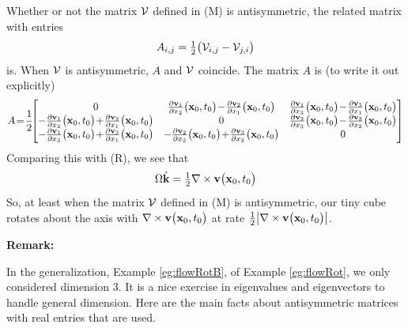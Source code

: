 \begin{eg}\label{eg:flowRotC}

Whether or not the matrix $\mathcal{V}$ defined in (M) is antisymmetric, 
the related matrix with entries
\begin{equation*}
A_{i,j}=\tfrac{1}{2}\big(\mathcal{V}_{i,j}-\mathcal{V}_{j,i}\big)
\end{equation*}
is.  When $\mathcal{V}$ is antisymmetric, $A$ and $\mathcal{V}$ coincide. The matrix $A$
is (to write it out explicitly)
\begin{equation*}
A\!=\!\frac{1}{2}\!\!\left[\begin{matrix}0 & 
                        \frac{\partial \vv_1}{\partial x_2}\big(\vx_0,t_0\big)
                   \!-\!\frac{\partial \vv_2}{\partial x_1}\big(\vx_0,t_0\big)&
                        \frac{\partial \vv_1}{\partial x_3}\big(\vx_0,t_0\big)
                  \!-\!\frac{\partial \vv_3}{\partial x_1}\big(\vx_0,t_0\big)\cr
                        -\frac{\partial \vv_1}{\partial x_2}\big(\vx_0,t_0\big)
                   \!+\!\frac{\partial \vv_2}{\partial x_1}\big(\vx_0,t_0\big)&
                        0 &
                        \frac{\partial \vv_2}{\partial x_3}\big(\vx_0,t_0\big)
                   \!-\!\frac{\partial \vv_3}{\partial x_2}\big(\vx_0,t_0\big)\cr
                       -\frac{\partial \vv_1}{\partial x_3}\big(\vx_0,t_0\big)
                    \!+\!\frac{\partial \vv_3}{\partial x_1}\big(\vx_0,t_0\big)&
                       -\frac{\partial \vv_2}{\partial x_3}\big(\vx_0,t_0\big)
                    \!+\!\frac{\partial \vv_3}{\partial x_2}\big(\vx_0,t_0\big)&
                     0\end{matrix}\right]
\end{equation*}
Comparing this with (R), we see that
\begin{equation*}
\Omega \hat{\mathbf{k}}=\tfrac{1}{2}\nabla\times \mathbf{v}\big(\mathbf{x}_0,t_0\big)
\end{equation*}
So, at least when the matrix $\mathcal{V}$ defined in (M) is antisymmetric, 
our tiny cube rotates about the axis with 
$\nabla\times \mathbf{v}\big(\mathbf{x}_0,t_0\big)$ at rate
$\tfrac{1}{2}\big|\nabla\times \mathbf{v}\big(\mathbf{x}_0,t_0\big)\big|$. 

\end{eg}

\noindent\textbf{Remark:}

\noindent
In the generalization, Example \ref{eg:flowRotB}, of 
Example \ref{eg:flowRot}, we only considered dimension 3. It
is a nice exercise in eigenvalues and eigenvectors to handle general dimension.
Here are the main facts about antisymmetric matrices with real entries
that are used.

